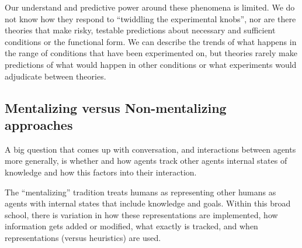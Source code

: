 \documentclass[]{article}
\begin{document}
Our understand and predictive power around these phenomena is limited. We do not know how they respond to ``twiddling the experimental knobs'', nor are there theories that make risky, testable predictions about necessary and sufficient conditions or the functional form.  We can describe the trends of what happens in the range of conditions that have been experimented on, but theories rarely make predictions of what would happen in other conditions or what experiments would adjudicate between theories. 




\subsection{Mentalizing versus Non-mentalizing approaches}

A big question that comes up with conversation, and interactions between agents more generally, is whether and how agents track other agents internal states of knowledge and how this factors into their interaction.



The ``mentalizing'' tradition treats humans as representing other humans as agents with internal states that include knowledge and goals.  Within this broad school, there is variation in how these representations are implemented, how information gets added or modified, what exactly is tracked, and when representations (versus heuristics) are used. 
\end{document}
